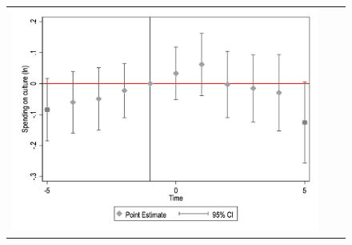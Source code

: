 \begin{figure}[!ht]
\begin{tabular}{@{}ccc@{}}
\begin{minipage}[t]{0.32\textwidth}
            \includegraphics[width=\linewidth]{images/pop_100000/eventdd_ln_q4_05_step1.jpg}
            \label{fig:culture}
        \end{minipage} \\[10pt]


\end{tabular}
\end{figure}
